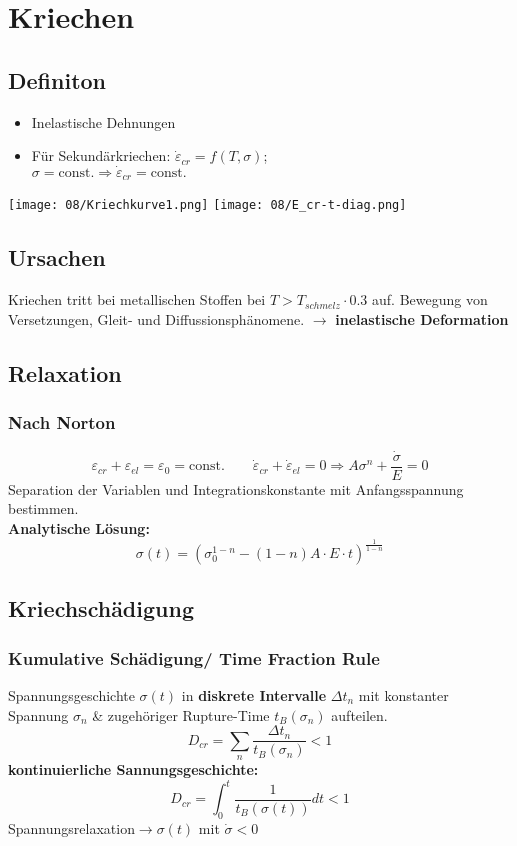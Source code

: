 \section{Kriechen}
    \subsection{Definiton}
        \begin{itemize}
            \item Inelastische Dehnungen
            \item Für Sekundärkriechen: $\dot{\varepsilon}_{cr} = f(T,\sigma)$;\\$\sigma = \textrm{const.} \Rightarrow \dot{\varepsilon}_{cr}= \textrm{const.}$
        \end{itemize}
        \texttt{[image: 08/Kriechkurve1.png]}
        \texttt{[image: 08/E\_cr-t-diag.png]}
    \subsection{Ursachen}
        Kriechen tritt bei metallischen Stoffen bei $ T > T_{schmelz} \cdot 0.3  $ auf.
        Bewegung von Versetzungen, Gleit- und Diffussionsphänomene. $\rightarrow$ \textbf{inelastische Deformation}
        
    \subsection{Relaxation}
        \subsubsection{Nach Norton}
            \[\varepsilon_{cr}+\varepsilon_{el}=\varepsilon_0=\textrm{const.} \qquad \dot{\varepsilon}_{cr}+\dot{\varepsilon}_{el}=0 \Rightarrow A\sigma^n + \frac{\dot{\sigma}}{E}=0\]
            Separation der Variablen und Integrationskonstante mit Anfangsspannung bestimmen.
            \\\textbf{Analytische Lösung:}
            \vspace{-2mm}\[\sigma(t)=\left(\sigma_{0}^{1-n}-(1-n)A\cdot E\cdot t\right)^{\frac{1}{1-n}}\]
    \subsection{Kriechschädigung}
        \subsubsection{Kumulative Schädigung/ Time Fraction Rule}
            Spannungsgeschichte $\sigma(t)$ in \textbf{diskrete Intervalle} $\Delta t_n$ mit konstanter Spannung $\sigma_n$ \& zugehöriger Rupture-Time $t_B(\sigma_n)$ aufteilen.
            \vspace{-2mm}\[D_{cr}=\sum_n\frac{\Delta t_{n}}{t_B(\sigma_n)} < 1\]
            \textbf{kontinuierliche Sannungsgeschichte:}
            \vspace{-2mm}\[D_{cr}=\int_0^t\frac{1}{t_B(\sigma(t))}dt < 1\]
            Spannungsrelaxation$\rightarrow \sigma(t)$ mit $\dot{\sigma}<0$
